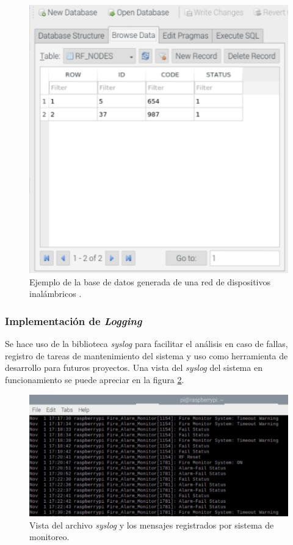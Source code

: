 \begin{figure}[ht]
	\centering
	\includegraphics[scale=.45]{./Figures/Capitulo4/Figura_O.png}
	\caption{Ejemplo de la base de datos generada de una red de dispositivos inalámbricos .}
	\label{fig:figura_o}
\end{figure}

\break

\subsubsection{Implementación de \textit{Logging} }
Se hace uso de la biblioteca \textit{syslog} para facilitar el análisis en caso de fallas, registro de tareas de mantenimiento del sistema y uso como herramienta de desarrollo para futuros proyectos. Una vista del \textit{syslog} del sistema en funcionamiento se puede apreciar en la figura \ref{fig:figura_q}.


\begin{figure}[ht]
	\centering
	\includegraphics[scale=.65]{./Figures/Capitulo4/Figura_Q.png}
	\caption{Vista del archivo \textit{syslog} y los mensajes registrados por sistema de monitoreo.}
	\label{fig:figura_q}
\end{figure}

